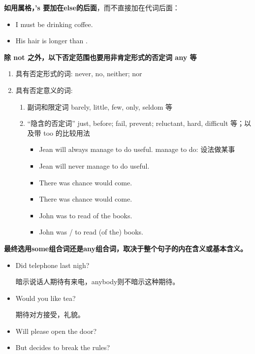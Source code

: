 \textbf{如用属格，'s 要加在else的后面}，而不直接加在代词后面：
\begin{itemize}
\item I must be drinking  coffee.
\item His hair is longer than .
\end{itemize}

\textbf{除 not 之外，以下否定范围也要用非肯定形式的否定词 any 等}
\begin{enumerate}
\item 具有否定形式的词: never, no, neither; nor
\item 具有否定意义的词:
  \begin{enumerate}
  \item 副词和限定词 barely, little, few, only, seldom 等
  \item “隐含的否定词” just, before; fail, prevent; reluctant, hard, difficult
    等；以及带 too 的比较用法
    \begin{itemize}
    \item Jean will always manage to do  useful. manage to do:
      设法做某事
    \item Jean will never manage to do  useful.
    \item There was  chance  would come.
    \item There was  chance  would come.
    \item John was  to read  of the books.
    \item John was / to read  (of the) books.
    \end{itemize}
  \end{enumerate}
\end{enumerate}

\textbf{最终选用some组合词还是any组合词，取决于整个句子的内在含义或基本含义。}
\begin{itemize}
\item Did  telephone last nigh?

  暗示说话人期待有来电，anybody则不暗示这种期待。

\item Would you like  tea?

  期待对方接受，礼貌。

\item Will  please open the door?


\item But   decides to break the
  rules?
\end{itemize}


